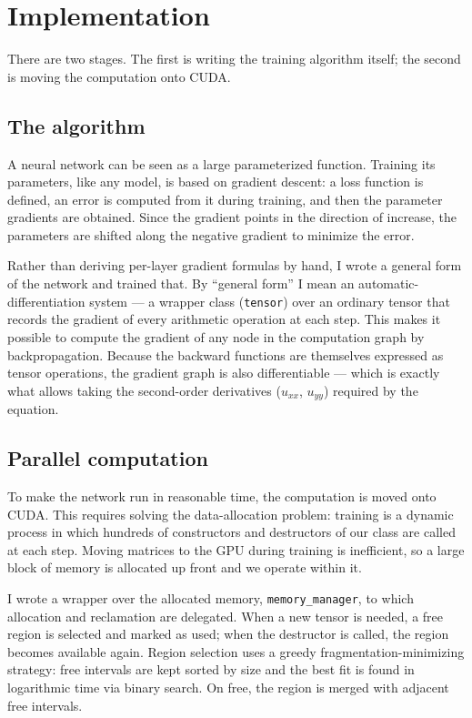\documentclass[12pt,a4paper]{article}
\begin{document}
\section{Implementation}

There are two stages. The first is writing the training algorithm itself; the
second is moving the computation onto CUDA.

\subsection{The algorithm}

A neural network can be seen as a large parameterized function. Training its
parameters, like any model, is based on gradient descent: a loss function is
defined, an error is computed from it during training, and then the parameter
gradients are obtained. Since the gradient points in the direction of increase,
the parameters are shifted along the negative gradient to minimize the error.

Rather than deriving per-layer gradient formulas by hand, I wrote a general form
of the network and trained that. By ``general form'' I mean an
automatic-differentiation system --- a wrapper class (\texttt{tensor}) over an
ordinary tensor that records the gradient of every arithmetic operation at each
step. This makes it possible to compute the gradient of any node in the
computation graph by backpropagation. Because the backward functions are
themselves expressed as tensor operations, the gradient graph is also
differentiable --- which is exactly what allows taking the second-order
derivatives ($u_{xx}$, $u_{yy}$) required by the equation.

\subsection{Parallel computation}

To make the network run in reasonable time, the computation is moved onto CUDA.
This requires solving the data-allocation problem: training is a dynamic process
in which hundreds of constructors and destructors of our class are called at each
step. Moving matrices to the GPU during training is inefficient, so a large block
of memory is allocated up front and we operate within it.

I wrote a wrapper over the allocated memory, \texttt{memory\_manager}, to which
allocation and reclamation are delegated. When a new tensor is needed, a free
region is selected and marked as used; when the destructor is called, the region
becomes available again. Region selection uses a greedy fragmentation-minimizing
strategy: free intervals are kept sorted by size and the best fit is found in
logarithmic time via binary search. On free, the region is merged with adjacent
free intervals.
\end{document}

